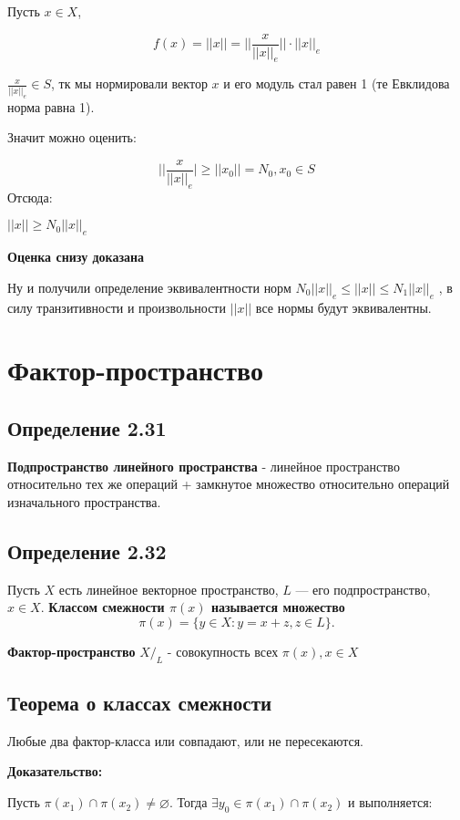 \documentclass[12pt]{article}
\begin{document}
		Пусть $x \in X$, 
		
		$$f(x) = ||x|| = ||\frac{x}{||x||_e}|| \cdot ||x||_e $$
		
		$\frac{x}{||x||_e} \in S$, тк мы нормировали вектор $x$ и его модуль стал равен 1 (те Евклидова норма равна 1).
		
	Значит можно оценить:
		 
	$$||\frac{x}{||x||_e}| \ge ||x_0|| = N_0, x_0 \in S$$
	Отсюда:
		 
	$||x|| \ge N_0 ||x||_e$
		 
 	\textbf{Оценка снизу доказана}
		
	Ну и получили определение эквивалентности норм
	$N_0||x||_e \leq ||x|| \leq N_1||x||_e$
	, в силу транзитивности и произвольности $||x||$ все нормы будут эквивалентны.

\newpage
\section{Фактор-пространство}

\subsection*{Определение 2.31}
	\textbf{Подпространство линейного пространства} - линейное пространство относительно тех же операций + замкнутое множество относительно операций изначального пространства.
	
\subsection*{Определение 2.32}	\label{eq102}
	Пусть $X$ есть линейное векторное пространство, $L$ — его подпространство, $x \in X$. \textbf{Классом смежности $\pi(x)$ называется множество} 
	$$\pi(x) = \{ y \in X : y = x + z, z \in L \}.$$
	
	\textbf{Фактор-пространство} $X\text{/}_L$ - совокупность всех $\pi(x), x \in X$
	
\subsection{Теорема о классах смежности}
		
	Любые два фактор-класса или совпадают, или не пересекаются.
	
\textbf{Доказательство:}

	Пусть $\pi(x_1) \cap \pi(x_2) \neq \varnothing$.
	Тогда $\exists y_0 \in \pi(x_1) \cap \pi(x_2)$ и выполняется:
 	
\end{document}
